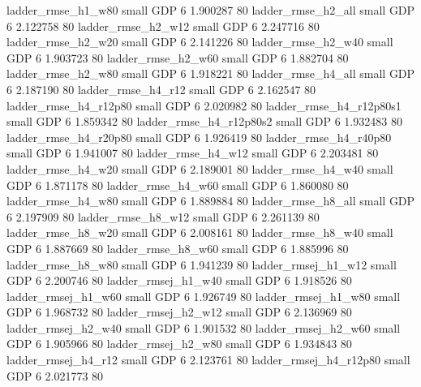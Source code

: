       ladder_rmse_h1_w80      small      GDP                 6 1.900287 80
      ladder_rmse_h2_all      small      GDP                 6 2.122758 80
      ladder_rmse_h2_w12      small      GDP                 6 2.247716 80
      ladder_rmse_h2_w20      small      GDP                 6 2.141226 80
      ladder_rmse_h2_w40      small      GDP                 6 1.903723 80
      ladder_rmse_h2_w60      small      GDP                 6 1.882704 80
      ladder_rmse_h2_w80      small      GDP                 6 1.918221 80
      ladder_rmse_h4_all      small      GDP                 6 2.187190 80
      ladder_rmse_h4_r12      small      GDP                 6 2.162547 80
   ladder_rmse_h4_r12p80      small      GDP                 6 2.020982 80
 ladder_rmse_h4_r12p80s1      small      GDP                 6 1.859342 80
 ladder_rmse_h4_r12p80s2      small      GDP                 6 1.932483 80
   ladder_rmse_h4_r20p80      small      GDP                 6 1.926419 80
   ladder_rmse_h4_r40p80      small      GDP                 6 1.941007 80
      ladder_rmse_h4_w12      small      GDP                 6 2.203481 80
      ladder_rmse_h4_w20      small      GDP                 6 2.189001 80
      ladder_rmse_h4_w40      small      GDP                 6 1.871178 80
      ladder_rmse_h4_w60      small      GDP                 6 1.860080 80
      ladder_rmse_h4_w80      small      GDP                 6 1.889884 80
      ladder_rmse_h8_all      small      GDP                 6 2.197909 80
      ladder_rmse_h8_w12      small      GDP                 6 2.261139 80
      ladder_rmse_h8_w20      small      GDP                 6 2.008161 80
      ladder_rmse_h8_w40      small      GDP                 6 1.887669 80
      ladder_rmse_h8_w60      small      GDP                 6 1.885996 80
      ladder_rmse_h8_w80      small      GDP                 6 1.941239 80
     ladder_rmsej_h1_w12      small      GDP                 6 2.200746 80
     ladder_rmsej_h1_w40      small      GDP                 6 1.918526 80
     ladder_rmsej_h1_w60      small      GDP                 6 1.926749 80
     ladder_rmsej_h1_w80      small      GDP                 6 1.968732 80
     ladder_rmsej_h2_w12      small      GDP                 6 2.136969 80
     ladder_rmsej_h2_w40      small      GDP                 6 1.901532 80
     ladder_rmsej_h2_w60      small      GDP                 6 1.905966 80
     ladder_rmsej_h2_w80      small      GDP                 6 1.934843 80
     ladder_rmsej_h4_r12      small      GDP                 6 2.123761 80
  ladder_rmsej_h4_r12p80      small      GDP                 6 2.021773 80
